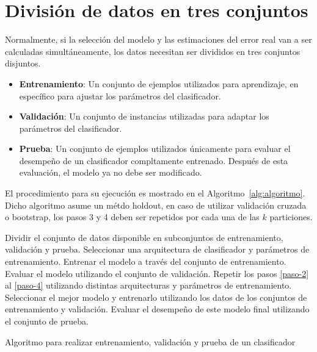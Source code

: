 \documentclass{article}
\begin{document}
\section{División de datos en tres conjuntos}
Normalmente, si la selección del modelo y las estimaciones del error real van a ser calculadas simultáneamente, los datos necesitan ser divididos en tres conjuntos disjuntos.
\begin{itemize}
	\item \textbf{Entrenamiento}: Un conjunto de ejemplos utilizados para aprendizaje, en específico para ajustar los parámetros del clasificador.
	\item \textbf{Validación}: Un conjunto de instancias utilizadas para adaptar los parámetros del clasificador.
	\item \textbf{Prueba}: Un conjunto de ejemplos utilizados únicamente para evaluar el desempeño de un clasificador compltamente entrenado. Después de esta evaluación, el modelo ya no debe ser modificado.
\end{itemize}

El procedimiento para su ejecución es mostrado en el Algoritmo~\ref{alg:algoritmo}. 
Dicho algoritmo asume un métdo holdout, en caso de utilizar validación cruzada o bootstrap, los pasos 3 y 4 deben ser repetidos por cada una de las $k$ particiones. 

\begin{algorithm} 
\begin{algorithmic}[1] 
\STATE Dividir el conjunto de datos disponible en subconjuntos de entrenamiento, validación y prueba.
\STATE Seleccionar una arquitectura de clasificador y parámetros de entrenamiento\label{paso-2}.
\STATE Entrenar el modelo a través del conjunto de entrenamiento. 
\STATE Evaluar el modelo utilizando el conjunto de validación. \label{paso-4}
\STATE Repetir los pasos \ref{paso-2} al \ref{paso-4} utilizando distintas arquitecturas y parámetros de entrenamiento.
\STATE Seleccionar el mejor modelo y entrenarlo utilizando los datos de los conjuntos de entrenamiento y validación.
\STATE Evaluar el desempeño de este modelo final utilizando el conjunto de prueba.
\end{algorithmic} 
\caption{Algoritmo para realizar entrenamiento, validación y prueba de un clasificador} 
\label{alg:algoritmo}
\end{algorithm}
\newpage 
\nocite{*}

 
\end{document}
